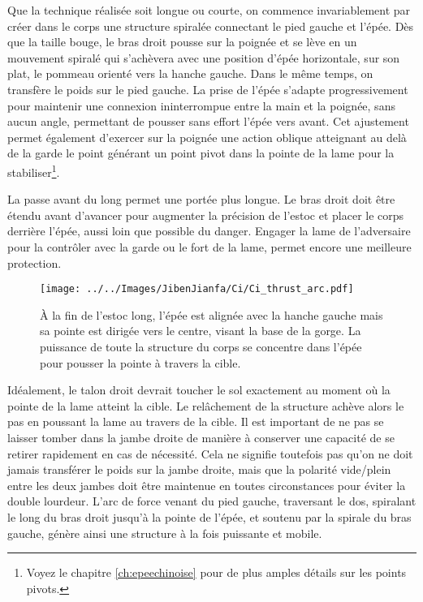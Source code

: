 Que la technique réalisée soit longue ou courte, on commence invariablement par créer dans le corps une structure spiralée connectant le pied gauche et l'épée. Dès que la taille bouge, le bras droit pousse sur la poignée et se lève en un mouvement spiralé qui s'achèvera avec une position d'épée horizontale, sur son plat, le pommeau orienté vers la hanche gauche. Dans le même temps, on transfère le poids sur le pied gauche. La prise de l'épée s'adapte progressivement pour maintenir une connexion ininterrompue entre la main et la poignée, sans aucun angle, permettant de pousser sans effort l'épée vers avant. Cet ajustement permet également d'exercer sur la poignée une action oblique atteignant au delà de la garde le point générant un point pivot dans la pointe de la lame pour la stabiliser\footnote{Voyez le chapitre \ref*{ch:epeechinoise} pour de plus amples détails sur les points pivots.}. 


La passe avant du \Ci{} long permet une portée plus longue. Le bras droit doit être étendu avant d'avancer pour augmenter la précision de l'estoc et placer le corps derrière l'épée, aussi loin que possible du danger. Engager la lame de l'adversaire pour la contrôler avec la garde ou le fort de la lame, permet encore une meilleure protection. 

\begin{figure}[ht]
\centering
	\texttt{[image: ../../Images/JibenJianfa/Ci/Ci\_thrust\_arc.pdf]}
	\caption[Estoc \Ci{} long]{\`{A} la fin de l'estoc \Ci{} long, l'épée est alignée avec la hanche gauche mais sa pointe est dirigée vers le centre, visant la base de la gorge. La puissance de toute la structure du corps se concentre dans l'épée pour pousser la pointe à travers la cible.}
	\label{fig:ci_thrust}
\end{figure}

Idéalement, le talon droit devrait toucher le sol exactement au moment où la pointe de la lame atteint la cible. Le relâchement de la structure achève alors le pas en poussant la lame au travers de la cible. Il est important de ne pas se laisser tomber dans la jambe droite de manière à conserver une capacité de se retirer rapidement en cas de nécessité. Cela ne signifie toutefois pas qu'on ne doit jamais transférer le poids sur la jambe droite, mais que la polarité vide/plein entre les deux jambes doit être maintenue en toutes circonstances pour éviter la double lourdeur. L'arc de force venant du pied gauche, traversant le dos, spiralant le long du bras droit jusqu'à la pointe de l'épée, et soutenu par la spirale du bras gauche, génère ainsi une structure à la fois puissante et mobile.



